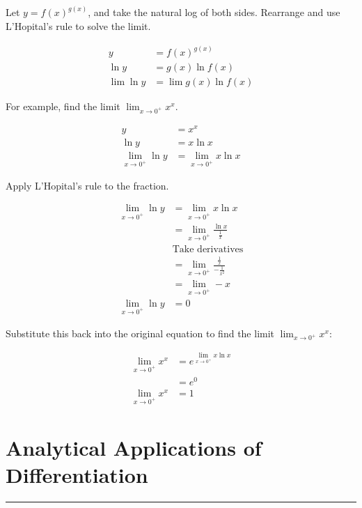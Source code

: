 \documentclass[12pt]{article}
\newcommand{\fline}{\par\noindent\rule{\textwidth}{0.1pt}} %
\begin{document}
Let $y = f(x)^{g(x)}$, and take the natural log of both sides. Rearrange and use L'Hopital's rule to solve the limit.

\begin{align*}
    y          & = f(x)^{g(x)}        \\
    \ln y      & = g(x) \ln f(x)      \\
    \lim \ln y & = \lim g(x) \ln f(x)
\end{align*}

For example, find the limit $\lim_{x \to 0^+} x^x$.

\begin{align*}
    y                      & = x^x                      \\
    \ln y                  & = x \ln x                  \\
    \lim_{x \to 0^+} \ln y & = \lim_{x \to 0^+} x \ln x
\end{align*}

Apply L'Hopital's rule to the fraction.

\begin{align*}
    \lim_{x \to 0^+} \ln y & = \lim_{x \to 0^+} x \ln x                            \\[6pt]
                           & = \lim_{x \to 0^+} \frac{\ln x}{\frac{1}{x}}          \\[6pt]
                           & \text{Take derivatives}                               \\
                           & = \lim_{x \to 0^+} \frac{\frac{1}{x}}{-\frac{1}{x^2}} \\[6pt]
                           & = \lim_{x \to 0^+} -x                                 \\
    \lim_{x \to 0^+} \ln y & = 0
\end{align*}

Substitute this back into the original equation to find the limit $\lim_{x \to 0^+} x^x$:

\begin{align*}
    \lim_{x \to 0^+} x^x & = e^{\lim_{x \to 0^+} x \ln x} \\
                         & = e^{0}                        \\
    \lim_{x \to 0^+} x^x & = 1
\end{align*}

\section{Analytical Applications of Differentiation}
\fline
\end{document}
